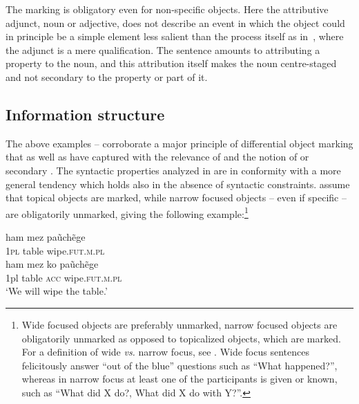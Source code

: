 \documentclass[output=paper]{LSP/langsci}
\begin{document}
The marking is obligatory even for non-specific   objects. Here the attributive adjunct, noun or adjective, does not describe an event in which the object could in principle be a simple element less salient than the process itself as in~, where the adjunct is a mere qualification. The sentence amounts to attributing a property to the noun, and this attribution itself makes the noun centre-staged and not secondary to the property or part of it.

\subsection{Information structure}
\label{10-mo-sec:2-4}

The above examples -- corroborate a major principle of differential object marking that \citet{Dalrympleetal2011Objects} as well as \citet{Iemmolo2010Topicality} have captured with the relevance of  and the notion of  \citep{Iemmolo2010Topicality} or secondary  \citep{Dalrympleetal2011Objects}. The syntactic properties analyzed in  are in conformity with a more general tendency which holds also in the absence of syntactic constraints. \citet{Dalrympleetal2011Objects} assume that topical objects are marked, while narrow focused objects – even if  specific – are obligatorily unmarked, giving the following  example:\footnote{Wide focused objects are preferably unmarked, narrow focused objects are obligatorily unmarked as opposed to topicalized objects, which are marked. For a definition of wide \textit{vs.} narrow focus, see \citet[215]{Rebuschietal1999Grammar}. Wide focus sentences felicitously answer “out of the blue” questions such as “What happened?”, whereas in narrow focus at least one of the participants is given or known, such as “What did X do?, What did X do with Y?”.} 

\ea {} \citep[167]{Dalrympleetal2011Objects}
\label{10-mo-ex:13} 

\ea \label{10-mo-ex:13a} 
\gll ham mez paũchẽge\\
\textsc{1pl} table wipe.\textsc{fut.m.pl}\\

\ex \label{10-mo-ex:13b} 
\gll ham mez ko paũchẽge\\
1pl table \textsc{acc} wipe.\textsc{fut.m.pl}\\
\glt ‘We will wipe the table.’ 
\z
\z
\end{document}
